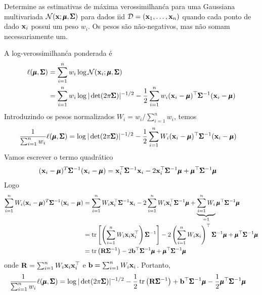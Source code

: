 \begin{exenumerate}
    
    \item Determine as estimativas de m\'axima verossimilhan\'ca para uma Gaussiana multivariada
    $\mathcal{N}(\mathbf{x}; \pmb{\mu}, \pmb{\Sigma})$ para dados iid $\mathcal{D} = (\mathbf{x}_1, \ldots, \mathbf{x}_n)$ quando
    cada ponto de dado $\mathbf{x}_i$ possui um peso $w_i$. Os pesos s\~ao n\~ao-negativos, mas n\~ao
    somam necessariamente um.
    
    \begin{solution}
        A log-verossimilhan\'ca ponderada \'e
        \begin{align}
            \ell(\pmb{\mu}, \pmb{\Sigma}) & = \sum_{i=1}^n w_i \log \mathcal{N}(\mathbf{x}_i; \pmb{\mu}, \pmb{\Sigma})\\
            & =  \sum_{i=1}^n w_i \log |\det(2 \pi \pmb{\Sigma})|^{-1/2} - \frac{1}{2} \sum_{i=1}^n w_i (\mathbf{x}_i-\pmb{\mu})^\top\pmb{\Sigma}^{-1}(\mathbf{x}_i-\pmb{\mu})
        \end{align}
        Introduzindo os pesos normalizados $W_i = w_i/ \sum_{i=1}^n w_i$, temos
        \begin{align}
            \frac{1}{ \sum_{i=1}^n w_i} \ell(\pmb{\mu}, \pmb{\Sigma})  &=  \log |\det(2 \pi \pmb{\Sigma})|^{-1/2} - \frac{1}{2} \sum_{i=1}^n W_i (\mathbf{x}_i-\pmb{\mu})^\top\pmb{\Sigma}^{-1}(\mathbf{x}_i-\pmb{\mu})
        \end{align}
        Vamos escrever o termo quadr\'atico
        \begin{align} 
            (\mathbf{x}_i-\pmb{\mu})^T\pmb{\Sigma}^{-1}(\mathbf{x}_i-\pmb{\mu}) &= \mathbf{x}_i^\top\pmb{\Sigma}^{-1}\mathbf{x}_i- 2\mathbf{x}_i^\top \pmb{\Sigma}^{-1} \pmb{\mu} + \pmb{\mu}^\top \pmb{\Sigma}^{-1} \pmb{\mu}
        \end{align}
        Logo
        \begin{align}
            \sum_{i=1}^n W_i (\mathbf{x}_i-\pmb{\mu})^T\pmb{\Sigma}^{-1}(\mathbf{x}_i-\pmb{\mu}) &= \sum_{i=1}^n W_i \mathbf{x}_i^\top\pmb{\Sigma}^{-1}\mathbf{x}_i -  2 \sum_{i=1}^n W_i\mathbf{x}_i^\top \pmb{\Sigma}^{-1} \pmb{\mu} +
            \underbrace{\sum_{i=1}^n W_i}_{=1}    \pmb{\mu}^\top \pmb{\Sigma}^{-1} \pmb{\mu}  \\
            & = \operatorname{tr}\left[ \left( \sum_{i=1}^n W_i \mathbf{x}_i \mathbf{x}_i^\top \right) \pmb{\Sigma}^{-1} \right]- 2 \left( \sum_{i=1}^n W_i\mathbf{x}_i  \right)^\top \pmb{\Sigma}^{-1} \pmb{\mu} +  \pmb{\mu}^\top \pmb{\Sigma}^{-1} \pmb{\mu} \\
            &= \operatorname{tr} \left( \mathbf{R} \pmb{\Sigma}^{-1}\right) -2 \mathbf{b}^\top \pmb{\Sigma}^{-1}\pmb{\mu} +  \pmb{\mu}^\top\pmb{\Sigma}^{-1} \pmb{\mu}
        \end{align}
        onde $\mathbf{R} = \sum_{i=1}^n W_i \mathbf{x}_i \mathbf{x}_i^\top $ e $\mathbf{b} =  \sum_{i=1}^n
        W_i\mathbf{x}_i$. Portanto,
        \begin{align}
            \frac{1}{ \sum_{i=1}^n w_i} \ell(\mub, \Sigmab)  &=  \log |\det(2 \pi \Sigmab)|^{-1/2} - \frac{1}{2} \tr \left( \R \Sigmab^{-1}\right) + \b^\top \Sigmab^{-1}\mub - \frac{1}{2}  \mub^\top\Sigmab^{-1} \mub

\end{align}
\end{solution}
\end{exenumerate}
